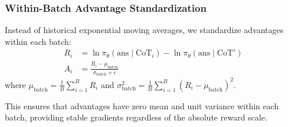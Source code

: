 \documentclass[letterpaper]{article} %
\begin{document}
\subsubsection{Within-Batch Advantage Standardization}
Instead of historical exponential moving averages, we standardize advantages within each batch:
\begin{align}
R_i &= \ln \pi_\theta(\text{ans} \mid \text{CoT}_i) - \ln \pi_\theta(\text{ans} \mid \text{CoT}') \\
A_i &= \frac{R_i - \mu_{\text{batch}}}{\sigma_{\text{batch}} + \epsilon}
\end{align}
where $\mu_{\text{batch}} = \frac{1}{B}\sum_{i=1}^B R_i$ and $\sigma_{\text{batch}}^2 = \frac{1}{B}\sum_{i=1}^B (R_i - \mu_{\text{batch}})^2$.

This ensures that advantages have zero mean and unit variance within each batch, providing stable gradients regardless of the absolute reward scale.
\end{document}
